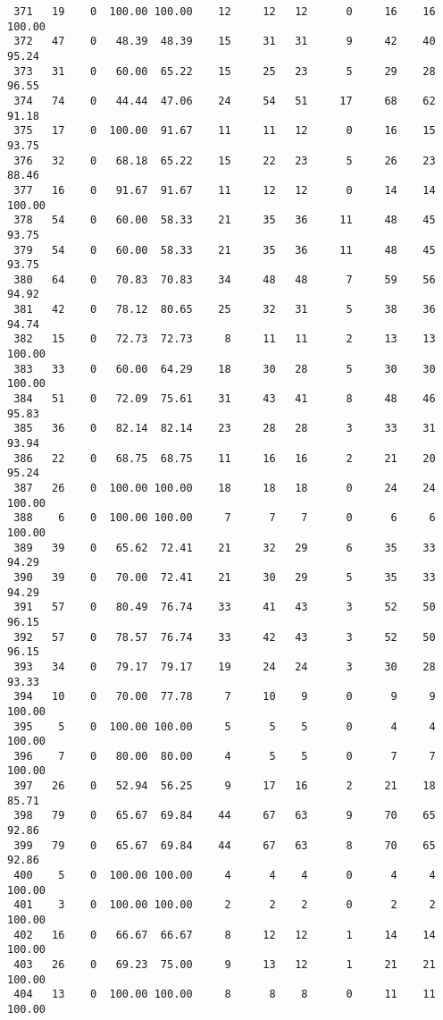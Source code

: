 \begin{verbatim}
 371   19    0  100.00 100.00    12     12   12      0     16    16   100.00
 372   47    0   48.39  48.39    15     31   31      9     42    40    95.24
 373   31    0   60.00  65.22    15     25   23      5     29    28    96.55
 374   74    0   44.44  47.06    24     54   51     17     68    62    91.18
 375   17    0  100.00  91.67    11     11   12      0     16    15    93.75
 376   32    0   68.18  65.22    15     22   23      5     26    23    88.46
 377   16    0   91.67  91.67    11     12   12      0     14    14   100.00
 378   54    0   60.00  58.33    21     35   36     11     48    45    93.75
 379   54    0   60.00  58.33    21     35   36     11     48    45    93.75
 380   64    0   70.83  70.83    34     48   48      7     59    56    94.92
 381   42    0   78.12  80.65    25     32   31      5     38    36    94.74
 382   15    0   72.73  72.73     8     11   11      2     13    13   100.00
 383   33    0   60.00  64.29    18     30   28      5     30    30   100.00
 384   51    0   72.09  75.61    31     43   41      8     48    46    95.83
 385   36    0   82.14  82.14    23     28   28      3     33    31    93.94
 386   22    0   68.75  68.75    11     16   16      2     21    20    95.24
 387   26    0  100.00 100.00    18     18   18      0     24    24   100.00
 388    6    0  100.00 100.00     7      7    7      0      6     6   100.00
 389   39    0   65.62  72.41    21     32   29      6     35    33    94.29
 390   39    0   70.00  72.41    21     30   29      5     35    33    94.29
 391   57    0   80.49  76.74    33     41   43      3     52    50    96.15
 392   57    0   78.57  76.74    33     42   43      3     52    50    96.15
 393   34    0   79.17  79.17    19     24   24      3     30    28    93.33
 394   10    0   70.00  77.78     7     10    9      0      9     9   100.00
 395    5    0  100.00 100.00     5      5    5      0      4     4   100.00
 396    7    0   80.00  80.00     4      5    5      0      7     7   100.00
 397   26    0   52.94  56.25     9     17   16      2     21    18    85.71
 398   79    0   65.67  69.84    44     67   63      9     70    65    92.86
 399   79    0   65.67  69.84    44     67   63      8     70    65    92.86
 400    5    0  100.00 100.00     4      4    4      0      4     4   100.00
 401    3    0  100.00 100.00     2      2    2      0      2     2   100.00
 402   16    0   66.67  66.67     8     12   12      1     14    14   100.00
 403   26    0   69.23  75.00     9     13   12      1     21    21   100.00
 404   13    0  100.00 100.00     8      8    8      0     11    11   100.00

\end{verbatim}

